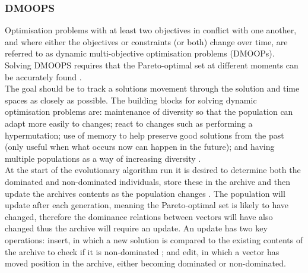\documentclass{ecmm427_assignment}
\begin{document}
\subsubsection{DMOOPS}
Optimisation problems with at least two objectives in conflict with one another, and where either the objectives or constraints (or both) change over time, are referred to as dynamic multi-objective optimisation problems (DMOOPs). Solving DMOOPS requires that the Pareto-optimal set at different moments can be accurately found \cite{Jiang2018}.
\\The goal should be to track a solutions movement through the solution and time spaces as closely as possible. The building blocks for solving dynamic optimisation problems are: maintenance of diversity so that the population can adapt more easily to changes; react to changes such as performing a hypermutation; use of memory to help preserve good solutions from the past (only useful when what occurs now can happen in the future); and having multiple populations as a way of increasing diversity \cite{Cruz2011}.\\
At the start of the evolutionary algorithm run it is desired to determine both the dominated and non-dominated individuals, store these in the archive and then update the archives contents as the population changes \cite{Drozdik2015}. The population will update after each generation, meaning the Pareto-optimal set is likely to have changed, therefore the dominance relations between vectors will have also changed thus the archive will require an update. An update has two key operations: insert, in which a new solution is compared to the existing contents of the archive to check if it is non-dominated \cite{Altwaijry2012}; and edit, in which a vector has moved position in the archive, either becoming dominated or non-dominated.
\end{document}
